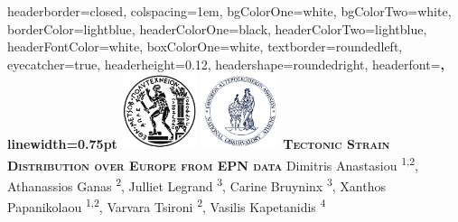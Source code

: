 \documentclass[landscape,a0paper,fontscale=0.315]{baposter} %
\begin{document}
\begin{poster}
{
headerborder=closed, %
colspacing=1em, %
bgColorOne=white, %
bgColorTwo=white, %
borderColor=lightblue, %
headerColorOne=black, %
headerColorTwo=lightblue, %
headerFontColor=white, %
boxColorOne=white, %
textborder=roundedleft, %
eyecatcher=true, %
headerheight=0.12\textheight, %
headershape=roundedright, %
headerfont=\Large\bf\textsc, %
linewidth=0.75pt %
}
%
{\includegraphics[height=6em]{../../logos/ntua.png} \includegraphics[height=6em]{../../logos/noa1.png}} %
{\bf\textsc{Tectonic Strain Distribution over Europe from EPN data}\vspace{0.3em} } %
{\large Dimitris Anastasiou \textsuperscript{1,2}, Athanassios Ganas \textsuperscript{2}, Julliet Legrand \textsuperscript{3}, Carine Bruyninx \textsuperscript{3}, Xanthos Papanikolaou \textsuperscript{1,2}, Varvara Tsironi \textsuperscript{2}, Vasilis Kapetanidis \textsuperscript{4} 
}
\end{poster}
\end{document}
